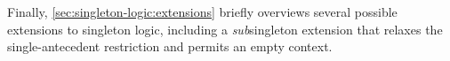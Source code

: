 
Finally, \cref{sec:singleton-logic:extensions} briefly overviews several possible extensions to singleton logic, including a \emph{sub}\-singleton extension that relaxes the single-an\-tecedent restriction and permits an empty context.







